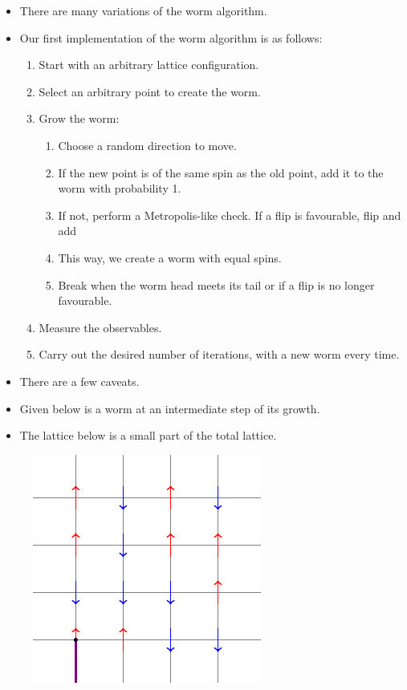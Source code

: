 \documentclass{beamer}
\begin{document}
\begin{frame}
\begin{itemize}
    \item There are many variations of the worm algorithm.
    \item Our first implementation of the worm algorithm is as follows:
    \begin{enumerate}
        \item Start with an arbitrary lattice configuration.\footnotemark
        \item Select an arbitrary point to create the worm.
        \item Grow the worm: \\
        \begin{enumerate}
            \item Choose a random direction to move.
            \item If the new point is of the same spin as the old point, add it to the worm with probability 1.
            \item If not, perform a Metropolis-like check. If a flip is favourable, flip and add
            \item This way, we create a worm with equal spins.
            \item Break when the worm head meets its tail or if a flip is no longer favourable.
        \end{enumerate}
        \item Measure the observables.
        \item Carry out the desired number of iterations, with a new worm every time.
    \end{enumerate}
    \item There are a few caveats.
\end{itemize}
\end{frame}

\begin{frame}
\begin{itemize}
    \item Given below is a worm at an intermediate step of its growth.
    \item The lattice below is a small part of the total lattice.
\end{itemize}
\begin{figure}
    \centering
    \includegraphics{tikz1.pdf}
\end{figure}
\end{frame}
\end{document}
